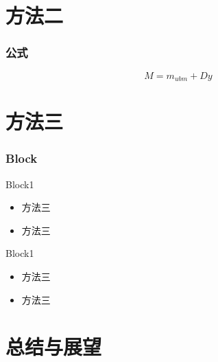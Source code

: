 \documentclass[12pt]{ctexbeamer}	%
\begin{document}

\section{方法二}

\begin{frame}
\frametitle{公式}
$$M=m_{ubm}+Dy$$
\end{frame}


\section{方法三}

\begin{frame}
\frametitle{Block}
\begin{block}{Block1}
	\begin{itemize}
		\item 方法三
        \item 方法三
	\end{itemize}
\end{block}
\pause
\begin{block}{Block1}
	\begin{itemize}
		\item 方法三
        \item 方法三
	\end{itemize}
\end{block}
\end{frame}


\section{总结与展望}
\end{document}
